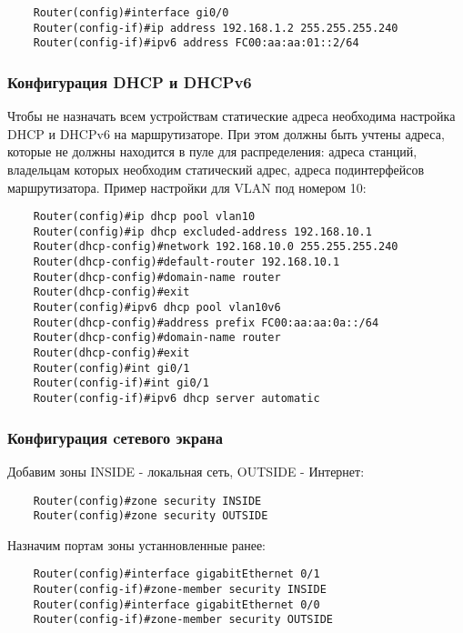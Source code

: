 \begin{lstlisting}
    Router(config)#interface gi0/0
    Router(config-if)#ip address 192.168.1.2 255.255.255.240
    Router(config-if)#ipv6 address FC00:aa:aa:01::2/64
\end{lstlisting}

\subsubsection{Конфигурация DHCP и DHCPv6}

Чтобы не назначать всем устройствам статические адреса необходима настройка DHCP и DHCPv6 на маршрутизаторе.
При этом должны быть учтены адреса, которые не должны находится в пуле для распределения: 
адреса станций, владельцам которых необходим статический адрес, 
адреса подинтерфейсов маршрутизатора. Пример настройки для VLAN под номером 10: 

\begin{lstlisting}
    Router(config)#ip dhcp pool vlan10
    Router(config)#ip dhcp excluded-address 192.168.10.1
    Router(dhcp-config)#network 192.168.10.0 255.255.255.240
    Router(dhcp-config)#default-router 192.168.10.1
    Router(dhcp-config)#domain-name router
    Router(dhcp-config)#exit
    Router(config)#ipv6 dhcp pool vlan10v6
    Router(dhcp-config)#address prefix FC00:aa:aa:0a::/64
    Router(dhcp-config)#domain-name router
    Router(dhcp-config)#exit
    Router(config)#int gi0/1
    Router(config-if)#int gi0/1
    Router(config-if)#ipv6 dhcp server automatic
\end{lstlisting}

\subsubsection{Конфигурация cетевого экрана}
Добавим зоны INSIDE - локальная сеть, OUTSIDE - Интернет:
\begin{lstlisting}
    Router(config)#zone security INSIDE
    Router(config)#zone security OUTSIDE
\end{lstlisting}

Назначим портам зоны устанновленные ранее:
\begin{lstlisting}
    Router(config)#interface gigabitEthernet 0/1
    Router(config-if)#zone-member security INSIDE
    Router(config)#interface gigabitEthernet 0/0
    Router(config-if)#zone-member security OUTSIDE
\end{lstlisting}

